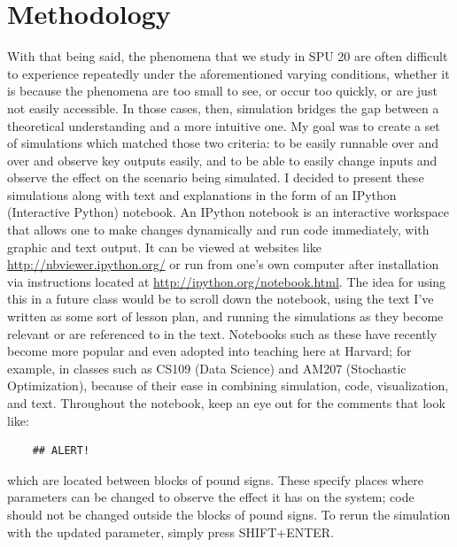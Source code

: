 \documentclass[12pt]{article}
\begin{document}
\section{Methodology}
With that being said, the phenomena that we study in SPU 20 are often difficult to experience repeatedly under the aforementioned varying conditions, whether it is because the phenomena are too small to see, or occur too quickly, or are just not easily accessible. In those cases, then, simulation bridges the gap between a theoretical understanding and a more intuitive one. My goal was to create a set of simulations which matched those two criteria: to be easily runnable over and over and observe key outputs easily, and to be able to easily change inputs and observe the effect on the scenario being simulated. I decided to present these simulations along with text and explanations in the form of an IPython (Interactive Python) notebook. An IPython notebook is an interactive workspace that allows one to make changes dynamically and run code immediately, with graphic and text output. It can be viewed at websites like \url{http://nbviewer.ipython.org/} or run from one's own computer after installation via instructions located at \url{http://ipython.org/notebook.html}. The idea for using this in a future class would be to scroll down the notebook, using the text I've written as some sort of lesson plan, and running the simulations as they become relevant or are referenced to in the text. Notebooks such as these have recently become more popular and even adopted into teaching here at Harvard; for example, in classes such as CS109 (Data Science) and AM207 (Stochastic Optimization), because of their ease in combining simulation, code, visualization, and text. Throughout the notebook, keep an eye out for the comments that look like:

\begin{verbatim}
    ## ALERT! 
\end{verbatim}
which are located between blocks of pound signs. These specify places where parameters can be changed to observe the effect it has on the system; code should not be changed outside the blocks of pound signs. To rerun the simulation with the updated parameter, simply press SHIFT+ENTER.
\end{document}

